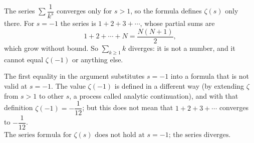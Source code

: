 The series $\sum\dfrac{1}{k^s}$ converges only for $s>1$, so the formula defines $\zeta(s)$ only there. For $s=-1$ the series is $1+2+3+\cdots$, whose partial sums are
\[
1+2+\cdots+N=\dfrac{N(N+1)}{2},
\]
which grow without bound. So $\sum_{k\ge1}k$ diverges: it is not a number, and it cannot equal $\zeta(-1)$ or anything else.

The first equality in the argument substitutes $s=-1$ into a formula that is not valid at $s=-1$. The value $\zeta(-1)$ is defined in a different way (by extending $\zeta$ from $s>1$ to other $s$, a process called analytic continuation), and with that definition $\zeta(-1)=-\dfrac{1}{12}$; but this does not mean that $1+2+3+\cdots$ converges to $-\dfrac{1}{12}$. $\boxed{\text{The series formula for }\zeta(s)\text{ does not hold at }s=-1\text{; the series diverges.}}$
